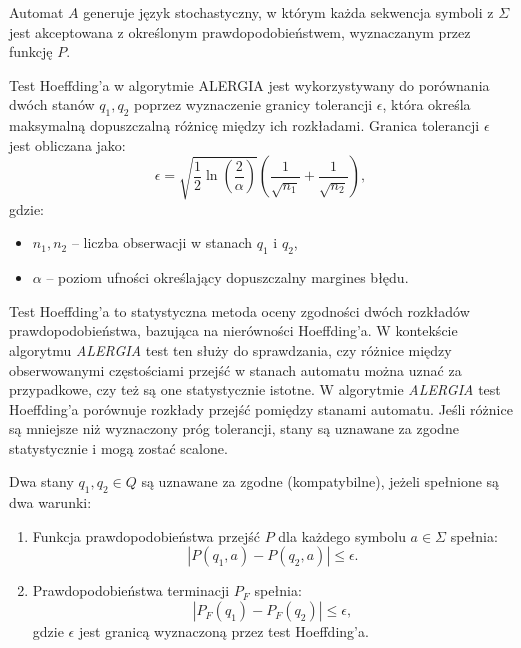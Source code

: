 Automat \( A \) generuje język stochastyczny, w którym każda sekwencja symboli z \( \Sigma \) jest akceptowana z określonym prawdopodobieństwem, wyznaczanym przez funkcję \( P \).

\begin{definition}  
\label{def:hoeffding_test}
Test Hoeffding’a w algorytmie ALERGIA jest wykorzystywany do porównania dwóch stanów \( q_1, q_2 \) poprzez wyznaczenie granicy tolerancji \( \epsilon \), która określa maksymalną dopuszczalną różnicę między ich rozkładami. Granica tolerancji \( \epsilon \) jest obliczana jako:  
\[
\epsilon = \sqrt{\frac{1}{2} \ln\left(\frac{2}{\alpha}\right)} \left( \frac{1}{\sqrt{n_1}} + \frac{1}{\sqrt{n_2}} \right),
\]
gdzie:  
\begin{itemize}  
    \item \( n_1, n_2 \) – liczba obserwacji w stanach \( q_1 \) i \( q_2 \),  
    \item \( \alpha \) – poziom ufności określający dopuszczalny margines błędu.  
\end{itemize}  
\end{definition}

Test Hoeffding’a to statystyczna metoda oceny zgodności dwóch rozkładów prawdopodobieństwa, bazująca na nierówności Hoeffding’a. W kontekście algorytmu \textit{ALERGIA} test ten służy do sprawdzania, czy różnice między obserwowanymi częstościami przejść w stanach automatu można uznać za przypadkowe, czy też są one statystycznie istotne. W algorytmie \textit{ALERGIA} test Hoeffding’a porównuje rozkłady przejść pomiędzy stanami automatu. Jeśli różnice są mniejsze niż wyznaczony próg tolerancji, stany są uznawane za zgodne statystycznie i mogą zostać scalone. 

\begin{definition}  
\label{def:alergia_state_compatibility}
Dwa stany \( q_1, q_2 \in Q \) są uznawane za zgodne (kompatybilne), jeżeli spełnione są dwa warunki:  
\begin{enumerate}
    \item Funkcja prawdopodobieństwa przejść \( P \) dla każdego symbolu \( a \in \Sigma \) spełnia:  
    \[
    |P(q_1, a) - P(q_2, a)| \leq \epsilon.
    \]  
    \item Prawdopodobieństwa terminacji \( P_F \) spełnia:
    \[
    |P_F(q_1) - P_F(q_2)| \leq \epsilon,
    \]  
    gdzie \( \epsilon \) jest granicą wyznaczoną przez test Hoeffding’a.
\end{enumerate}
\end{definition} 

